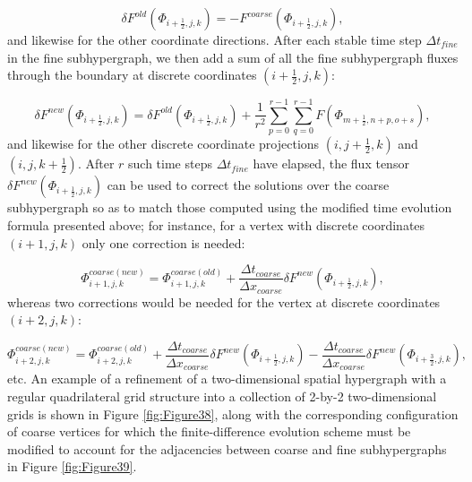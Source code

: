 \documentclass{article}
\begin{document}
\begin{equation}
\delta F^{old} \left( \Phi_{i + \frac{1}{2}, j, k} \right) = - F^{coarse} \left( \Phi_{i + \frac{1}{2}, j, k} \right),
\end{equation}
and likewise for the other coordinate directions. After each stable time step ${\Delta t_{fine}}$ in the fine subhypergraph, we then add a sum of all the fine subhypergraph fluxes through the boundary at discrete coordinates ${\left( i + \frac{1}{2}, j, k \right)}$:

\begin{equation}
\delta F^{new} \left( \Phi_{i + \frac{1}{2}, j, k} \right) = \delta F^{old} \left( \Phi_{i + \frac{1}{2}, j, k} \right) + \frac{1}{r^2} \sum_{p = 0}^{r - 1} \sum_{q = 0}^{r - 1} F \left( \Phi_{m + \frac{1}{2}, n + p, o + s} \right),
\end{equation}
and likewise for the other discrete coordinate projections ${\left( i, j + \frac{1}{2}, k \right)}$ and ${\left( i, j, k + \frac{1}{2} \right)}$. After $r$ such time steps ${\Delta t_{fine}}$ have elapsed, the flux tensor ${\delta F^{new} \left( \Phi_{i + \frac{1}{2}, j, k} \right)}$ can be used to correct the solutions over the coarse subhypergraph so as to match those computed using the modified time evolution formula presented above; for instance, for a vertex with discrete coordinates ${\left( i + 1, j, k \right)}$ only one correction is needed:

\begin{equation}
\Phi_{i + 1, j, k}^{coarse \left( new \right)} = \Phi_{i + 1, j, k}^{coarse \left( old \right)} + \frac{\Delta t_{coarse}}{\Delta x_{coarse}} \delta F^{new} \left( \Phi_{i + \frac{1}{2}, j, k} \right),
\end{equation}
whereas two corrections would be needed for the vertex at discrete coordinates ${\left( i + 2, j, k \right)}$:

\begin{equation}
\Phi_{i + 2, j, k}^{coarse \left( new \right)} = \Phi_{i + 2, j, k}^{coarse \left( old \right)} + \frac{\Delta t_{coarse}}{\Delta x_{coarse}} \delta F^{new} \left( \Phi_{i + \frac{1}{2}, j, k} \right) - \frac{\Delta t_{coarse}}{\Delta x_{coarse}} \delta F^{new} \left( \Phi_{i + \frac{3}{2}, j, k} \right),
\end{equation}
etc. An example of a refinement of a two-dimensional spatial hypergraph with a regular quadrilateral grid structure into a collection of 2-by-2 two-dimensional grids is shown in Figure \ref{fig:Figure38}, along with the corresponding configuration of coarse vertices for which the finite-difference evolution scheme must be modified to account for the adjacencies between coarse and fine subhypergraphs in Figure \ref{fig:Figure39}.
\end{document}
